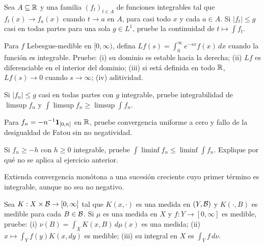 \begin{ejercicio}\label{ej:v2-l10-2}
Sea $A\subseteq\mathbb R$ y una familia $(f_t)_{t\in A}$ de funciones integrables tal que $f_t(x)\to f_a(x)$ cuando $t\to a$ en $A$, para casi todo $x$ y cada $a\in A$. Si $|f_t|\le g$ casi en todas partes para una sola $g\in L^1$, pruebe la continuidad de $t\mapsto\int f_t$.
\end{ejercicio}

\begin{ejercicio}\label{ej:v2-l10-3}
Para $f$ Lebesgue-medible en $[0,\infty)$, defina $Lf(s)=\int_0^\infty e^{-sx}f(x)\,dx$ cuando la función es integrable. Pruebe: (i) su dominio es estable hacia la derecha; (ii) $Lf$ es diferenciable en el interior del dominio; (iii) si está definida en todo $\mathbb R$, $Lf(s)\to0$ cuando $s\to\infty$; (iv) aditividad.
\end{ejercicio}

\begin{ejercicio}\label{ej:v2-l10-4}
Si $|f_n|\le g$ casi en todas partes con $g$ integrable, pruebe integrabilidad de $\limsup f_n$ y $\int\limsup f_n\ge\limsup\int f_n$.
\end{ejercicio}

\begin{ejercicio}\label{ej:v2-l10-5}
Para $f_n=-n^{-1}\mathbf1_{[0,n]}$ en $\mathbb R$, pruebe convergencia uniforme a cero y fallo de la desigualdad de Fatou sin no negatividad.
\end{ejercicio}

\begin{ejercicio}\label{ej:v2-l10-6}
Si $f_n\ge-h$ con $h\ge0$ integrable, pruebe $\int\liminf f_n\le\liminf\int f_n$. Explique por qué no se aplica al ejercicio anterior.
\end{ejercicio}

\begin{ejercicio}\label{ej:v2-l10-7}
Extienda convergencia monótona a una sucesión creciente cuyo primer término es integrable, aunque no sea no negativo.
\end{ejercicio}

\begin{ejercicio}\label{ej:v2-l10-8}
Sea $K:X\times\mathcal B\to[0,\infty]$ tal que $K(x,\cdot)$ es una medida en $(Y,\mathcal B)$ y $K(\cdot,B)$ es medible para cada $B\in\mathcal B$. Si $\mu$ es una medida en $X$ y $f:Y\to[0,\infty]$ es medible, pruebe: (i) $\nu(B)=\int_XK(x,B)\,d\mu(x)$ es una medida; (ii) $x\mapsto\int_Yf(y)K(x,dy)$ es medible; (iii) su integral en $X$ es $\int_Yf\,d\nu$.
\end{ejercicio}

